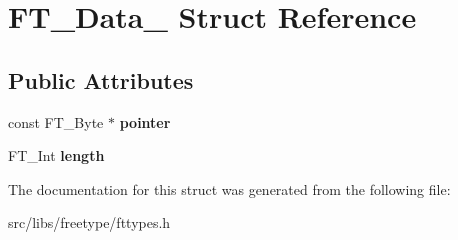 \hypertarget{struct_f_t___data__}{
\section{FT\_\-Data\_\- Struct Reference}
\label{struct_f_t___data__}
}
\subsection*{Public Attributes}
\begin{DoxyCompactItemize}
\item 
\hypertarget{struct_f_t___data___a4dea731b8a256b973757e1b8f612b050}{
const FT\_\-Byte $\ast$ {\bfseries pointer}}
\label{struct_f_t___data___a4dea731b8a256b973757e1b8f612b050}

\item 
\hypertarget{struct_f_t___data___af60c89dccd1852aceb0dc08675aca2fd}{
FT\_\-Int {\bfseries length}}
\label{struct_f_t___data___af60c89dccd1852aceb0dc08675aca2fd}

\end{DoxyCompactItemize}


The documentation for this struct was generated from the following file:\begin{DoxyCompactItemize}
\item 
src/libs/freetype/fttypes.h\end{DoxyCompactItemize}
